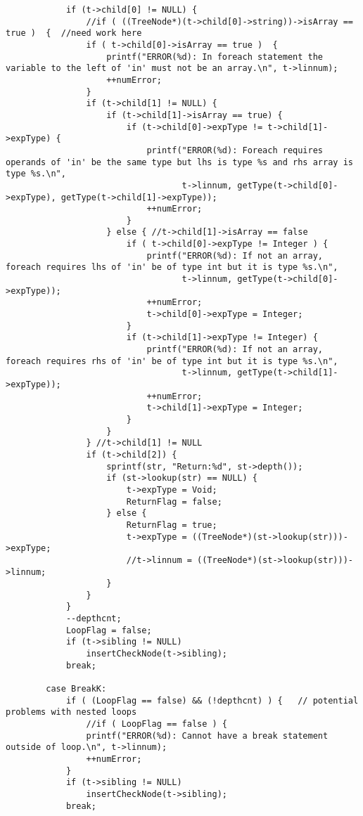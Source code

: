 \documentclass[12pt]{book}
\begin{document}
\begin{lstlisting}
            if (t->child[0] != NULL) {
                //if ( ((TreeNode*)(t->child[0]->string))->isArray == true )  {  //need work here
                if ( t->child[0]->isArray == true )  {
                    printf("ERROR(%d): In foreach statement the variable to the left of 'in' must not be an array.\n", t->linnum);
                    ++numError;
                }
                if (t->child[1] != NULL) {
                    if (t->child[1]->isArray == true) {
                        if (t->child[0]->expType != t->child[1]->expType) {
                            printf("ERROR(%d): Foreach requires operands of 'in' be the same type but lhs is type %s and rhs array is type %s.\n", 
                                   t->linnum, getType(t->child[0]->expType), getType(t->child[1]->expType));  
                            ++numError;  
                        }
                    } else { //t->child[1]->isArray == false
                        if ( t->child[0]->expType != Integer ) {
                            printf("ERROR(%d): If not an array, foreach requires lhs of 'in' be of type int but it is type %s.\n", 
                                   t->linnum, getType(t->child[0]->expType)); 
                            ++numError;
                            t->child[0]->expType = Integer; 
                        } 
                        if (t->child[1]->expType != Integer) {
                            printf("ERROR(%d): If not an array, foreach requires rhs of 'in' be of type int but it is type %s.\n", 
                                   t->linnum, getType(t->child[1]->expType)); 
                            ++numError;
                            t->child[1]->expType = Integer; 
                        }
                    }
                } //t->child[1] != NULL
                if (t->child[2]) {
                    sprintf(str, "Return:%d", st->depth());
                    if (st->lookup(str) == NULL) {
                        t->expType = Void;
                        ReturnFlag = false;
                    } else {
                        ReturnFlag = true;
                        t->expType = ((TreeNode*)(st->lookup(str)))->expType;
                        //t->linnum = ((TreeNode*)(st->lookup(str)))->linnum;
                    }
                }
            }
            --depthcnt;
            LoopFlag = false;
            if (t->sibling != NULL) 
                insertCheckNode(t->sibling);
            break;

        case BreakK:
            if ( (LoopFlag == false) && (!depthcnt) ) {   // potential problems with nested loops
                //if ( LoopFlag == false ) {
                printf("ERROR(%d): Cannot have a break statement outside of loop.\n", t->linnum);  
                ++numError;
            } 
            if (t->sibling != NULL)
                insertCheckNode(t->sibling);
            break;


\end{lstlisting}
\end{document}
